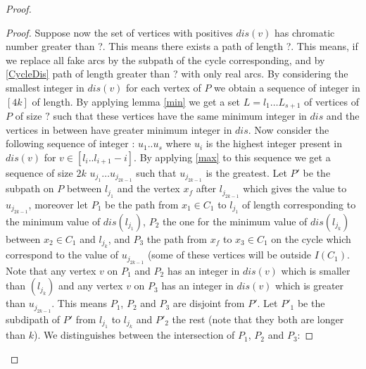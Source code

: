 \documentclass[10pt]{article}
\theoremstyle{plain}
\theoremstyle{definition}
\theoremstyle{remark}
\begin{document}
\begin{proof}
\begin{proof}



Suppose now the set of vertices with positives $dis(v)$ has chromatic number greater than ?. This means there exists a path of length ?. This means,
if we replace all fake arcs by the subpath of the cycle corresponding, and by \ref{CycleDis} path of length greater than ? with only real arcs. 
By considering the smallest integer in $dis(v)$ for each vertex of $P$ we obtain a sequence of integer in $[4k]$ of length. 
By applying lemma \ref{min} we get a set $L = l_1 \dots L_{s+1}$ of vertices of $P$ of size $?$ such that these 
vertices have the same minimum integer in $dis$ and the vertices in between have greater minimum integer in $dis$. 
Now consider the following sequence of integer : $u_1 .. u_s$ where $u_i$ is the highest integer present in $dis(v)$ for $v \in [l_i .. l_{i+1} - i]$. 
By applying \ref{max} to this sequence we get a sequence of size $2k$ $u_{j_1} \dots u_{j_{2k-1}}$ such that $u_{j_{2k-1}}$ is the greatest.
Let $P'$ be the subpath on $P$ between $l_{j_1}$ and the vertex $x_f$ after $l_{j_{2k-1}}$ which gives the value to $u_{j_{2k-1}}$, moreover let $P_1$ 
be the path from $x_1 \in C_1$ to $l_{j_1}$ of length corresponding to the minimum value of $dis(l_{j_1})$, $P_2$ the one for the minimum 
value of $dis(l_{j_k})$ between $x_2 \in C_1$ and $l_{j_k}$, and $P_3$ the path from $x_f$ to $x_3 \in C_1$ on the cycle which correspond to the 
value of $u_{j_{2k-1}}$ (some of these vertices will be outside $I(C_1)$. Note that any vertex $v$ on $P_1$ and $P_2$ has an integer in $dis(v)$ 
which is smaller than $(l_{j_k})$ and any vertex $v$ on $P_3$ has an integer in $dis(v)$ which is greater than $u_{j_{2k-1}}$. This means 
$P_1$, $P_2$ and $P_3$ are disjoint from $P'$. Let $P'_1$ be the subdipath of $P'$ from $l_{j_1}$ to $l_{j_k}$ and  $P'_2$ the rest
(note that they both are longer than $k$). 
We distinguishes between the intersection of $P_1$, $P_2$ and $P_3$:


\end{proof}
\end{proof}
\end{document}
